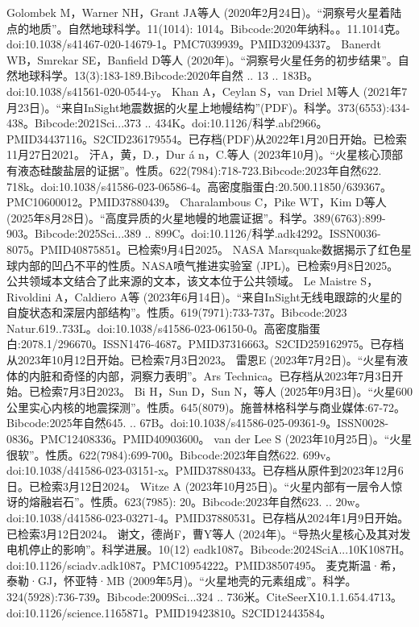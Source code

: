 \begin{enumerate}
 Golombek M，Warner NH，Grant JA等人 (2020年2月24日)。“洞察号火星着陆点的地质”。自然地球科学。11(1014): 1014。Bibcode:2020年纳科。。11.1014克。doi:10.1038/s41467-020-14679-1。PMC7039939。PMID32094337。   
 Banerdt WB，Smrekar SE，Banfield D等人 (2020年)。“洞察号火星任务的初步结果”。自然地球科学。13(3):183-189.Bibcode:2020年自然 .. 13 .. 183B。doi:10.1038/s41561-020-0544-y。
 Khan A，Ceylan S，van Driel M等人 (2021年7月23日)。“来自InSight地震数据的火星上地幔结构”(PDF)。科学。373(6553):434-438。Bibcode:2021Sci...373 .. 434K。doi:10.1126/科学.abf2966。PMID34437116。S2CID236179554。已存档(PDF)从2022年1月20日开始。已检索11月27日2021。   
 汗A，黄，D.，Dur á n，C.等人 (2023年10月)。“火星核心顶部有液态硅酸盐层的证据”。性质。622(7984):718-723.Bibcode:2023年自然622. 718k。doi:10.1038/s41586-023-06586-4。高密度脂蛋白:20.500.11850/639367。PMC10600012。PMID37880439。   
 Charalambous C，Pike WT，Kim D等人 (2025年8月28日)。“高度异质的火星地幔的地震证据”。科学。389(6763):899-903。Bibcode:2025Sci...389 .. 899C。doi:10.1126/科学.adk4292。ISSN0036-8075。PMID40875851。已检索9月4日2025。   
 NASA Marsquake数据揭示了红色星球内部的凹凸不平的性质。NASA喷气推进实验室 (JPL)。已检索9月8日2025。 公共领域本文结合了此来源的文本，该文本位于公共领域。
 Le Maistre S，Rivoldini A，Caldiero A等 (2023年6月14日)。“来自InSight无线电跟踪的火星的自旋状态和深层内部结构”。性质。619(7971):733-737。Bibcode:2023 Natur.619..733L。doi:10.1038/s41586-023-06150-0。高密度脂蛋白:2078.1/296670。ISSN1476-4687。PMID37316663。S2CID259162975。已存档从2023年10月12日开始。已检索7月3日2023。   
 雷恩E (2023年7月2日)。“火星有液体的内脏和奇怪的内部，洞察力表明”。Ars Technica。已存档从2023年7月3日开始。已检索7月3日2023。
 Bi H，Sun D，Sun N，等人 (2025年9月3日)。“火星600公里实心内核的地震探测”。性质。645(8079)。施普林格科学与商业媒体:67-72。Bibcode:2025年自然645. .. 67B。doi:10.1038/s41586-025-09361-9。ISSN0028-0836。PMC12408336。PMID40903600。    
 van der Lee S (2023年10月25日)。“火星很软”。性质。622(7984):699-700。Bibcode:2023年自然622. 699v。doi:10.1038/d41586-023-03151-x。PMID37880433。已存档从原件到2023年12月6日。已检索3月12日2024。 
 Witze A (2023年10月25日)。“火星内部有一层令人惊讶的熔融岩石”。性质。623(7985): 20。Bibcode:2023年自然623. .. 20w。doi:10.1038/d41586-023-03271-4。PMID37880531。已存档从2024年1月9日开始。已检索3月12日2024。 
 谢文，德尚F，曹Y等人 (2024年)。“导热火星核心及其对发电机停止的影响”。科学进展。10(12) eadk1087。Bibcode:2024SciA...10K1087H。doi:10.1126/sciadv.adk1087。PMC10954222。PMID38507495。  
 麦克斯温·希，泰勒·GJ，怀亚特·MB (2009年5月)。“火星地壳的元素组成”。科学。324(5928):736-739。Bibcode:2009Sci...324 .. 736米。CiteSeerX10.1.1.654.4713。doi:10.1126/science.1165871。PMID19423810。S2CID12443584。   

\end{enumerate}

